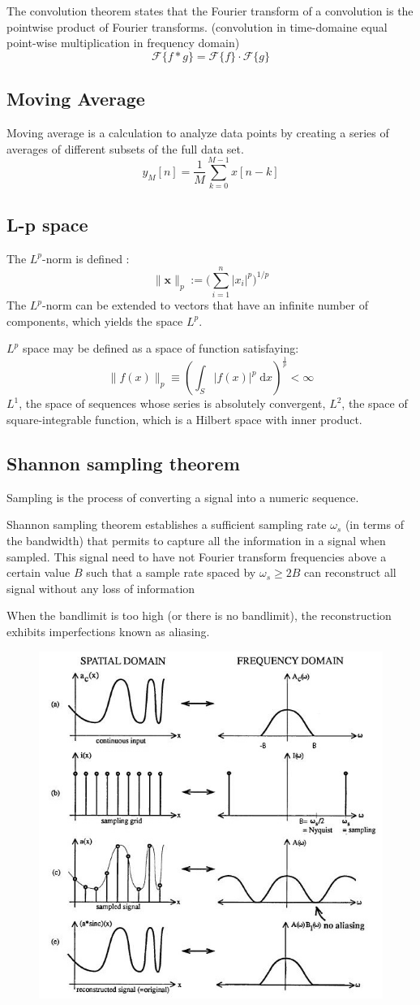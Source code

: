 \documentclass[twocolumn]{article}
\numberwithin{equation}{section}
\begin{document}
The convolution theorem states that the Fourier transform of a convolution is the pointwise product of Fourier transforms. (convolution in time-domaine equal point-wise multiplication in frequency domain)
$$\mathcal{F}\{f*g\} = \mathcal{F}\{f\} \cdot \mathcal{F}\{g\}$$

	\subsection{Moving Average}
Moving average is a calculation to analyze data points by creating a series of averages of different subsets of the full data set.
$$y_M[n]=\frac{1}{M}\sum_{k=0}^{M-1} x[n-k]$$


	\subsection{L-p space}
The $L^p$-norm is defined :
$$\|\mathbf{x}\|_p := \bigg( \sum_{i=1}^n |x_i|^p \bigg)^{1/p}$$
The $L^p$-norm can be extended to vectors that have an infinite number of components, which yields the space $L^p$.

$L^p$ space may be defined as a space of function satisfaying:
$$\|f(x)\|_p \equiv \left({\int_S |f(x)|^p\;\mathrm{d} x}\right)^{\frac{1}{p}}<\infty$$
$L^ 1$, the space of sequences whose series is absolutely convergent,
$L^2$, the space of square-integrable function, which is a Hilbert space with inner product.


	\subsection{Shannon sampling theorem}
Sampling is the process of converting a signal into a numeric sequence.

Shannon sampling theorem establishes a sufficient sampling rate $\omega_s$ (in terms of the bandwidth) that permits to capture all the information in a signal when sampled. This signal need to have not Fourier transform frequencies above a certain value $B$ such that a sample rate spaced by $\omega_s \ge 2B$ can reconstruct all signal without any loss of information

When the bandlimit is too high (or there is no bandlimit), the reconstruction exhibits imperfections known as aliasing.
\begin{figure}[H]
\centering
    \includegraphics[width=.40\textwidth]{Sampl_Nyquist_F34.jpg}
\end{figure}
\end{document}
